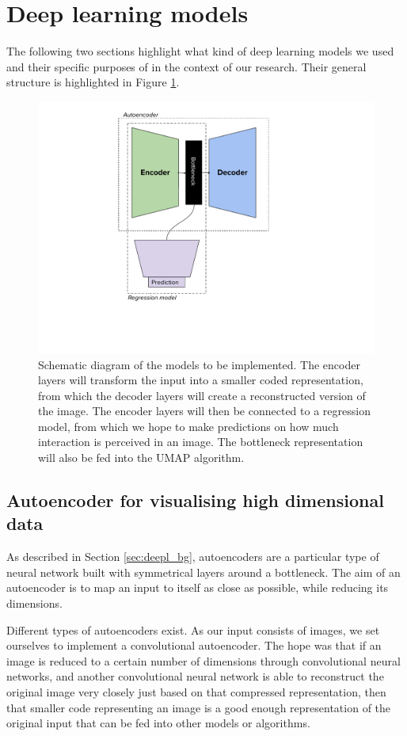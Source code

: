 \section{Deep learning models}

The following two sections highlight what kind of deep learning models we used and their specific purposes of in the context of our research. Their general structure is highlighted in Figure \ref{fig:connected_models}.

\begin{figure}[h]
    \centering
    \includegraphics[width=.5\textwidth]{dissertation/figures/autoencoder_regression_connection.pdf}
    \caption{Schematic diagram of the models to be implemented. The encoder layers will transform the input into a smaller coded representation, from which the decoder layers will create a reconstructed version of the image. The encoder layers will then be connected to a regression model, from which we hope to make predictions on how much interaction is perceived in an image. The bottleneck representation will also be fed into the UMAP algorithm.}
    \label{fig:connected_models}
\end{figure}

\subsection{Autoencoder for visualising high dimensional data}

As described in Section \ref{sec:deepl_bg}, autoencoders are a particular type of neural network built with symmetrical layers around a bottleneck. The aim of an autoencoder is to map an input to itself as close as possible, while reducing its dimensions.

Different types of autoencoders exist. As our input consists of images, we set ourselves to implement a convolutional autoencoder. The hope was that if an image is reduced to a certain number of dimensions through convolutional neural networks, and another convolutional neural network is able to reconstruct the original image very closely just based on that compressed representation, then that smaller code representing an image is a good enough representation of the original input that can be fed into other models or algorithms. 

